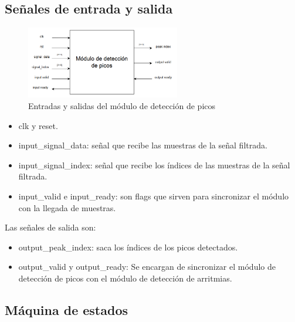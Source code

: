 \subsection{Señales de entrada y salida}

    \begin{figure}[h!]
        \centering
        \includegraphics[width=0.6\textwidth]{./Images/img_implementacion_hw/diagramamodulodeteccionpicos.png}
        \caption{Entradas y salidas del módulo de detección de picos}
        \label{fig:moddeteccionpicos}
    \end{figure} 
    
    \begin{itemize}
    \item clk y reset.
    \item input\_signal\_data: señal que recibe las muestras de la señal filtrada.
    \item input\_signal\_index: señal que recibe los índices de las muestras de la señal filtrada.
    \item input\_valid e input\_ready: son flags que sirven para sincronizar el módulo con la llegada de muestras. 
    \end{itemize}
    
    Las señales de salida son:
    
    \begin{itemize}
        \item output\_peak\_index: saca los índices de los picos detectados.
        \item output\_valid y output\_ready: Se encargan de sincronizar el módulo de detección de picos 
        con el módulo de detección de arritmias.
    \end{itemize}

\subsection{Máquina de estados}

